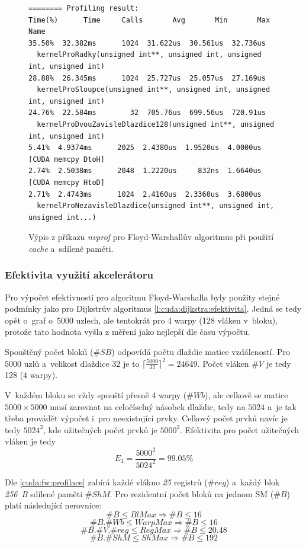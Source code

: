 \begin{figure}
	\centering
	\begin{verbatim}
======== Profiling result:
Time(%)      Time     Calls       Avg       Min       Max  Name
35.50%  32.382ms      1024  31.622us  30.561us  32.736us
  kernelProRadky(unsigned int**, unsigned int, unsigned int, unsigned int)
28.88%  26.345ms      1024  25.727us  25.057us  27.169us
  kernelProSloupce(unsigned int**, unsigned int, unsigned int, unsigned int)
24.76%  22.584ms        32  705.76us  699.56us  720.91us
  kernelProDvouZavisleDlazdice128(unsigned int**, unsigned int, unsigned int)
5.41%  4.9374ms      2025  2.4380us  1.9520us  4.0000us  [CUDA memcpy DtoH]
2.74%  2.5038ms      2048  1.2220us     832ns  1.6640us  [CUDA memcpy HtoD]
2.71%  2.4743ms      1024  2.4160us  2.3360us  3.6800us
  kernelProNezavisleDlazdice(unsigned int**, unsigned int, unsigned int...)
	\end{verbatim}
	\caption{Výpis z příkazu \emph{nvprof} pro Floyd-Warshallův algoritmus při použití \emph{cache} a~sdílené paměti.}
    \label{f:cuda:floyd:profilace2}
\end{figure}

\subsubsection{Efektivita využití akcelerátoru} \label{l:cuda:floyd:efektivita}
Pro výpočet efektivnosti pro algoritmu Floyd-Warshalla byly použity stejné podmínky jako pro Dijkstrův algoritmus \ref{l:cuda:dijkstra:efektivita}. Jedná se tedy opět o~graf o~5000 uzlech, ale tentokrát pro 4 warpy (128 vláken v~bloku), protože tato hodnota vyšla z měření jako nejlepší dle času výpočtu.

Spouštěný počet bloků ($\#SB$) odpovídá počtu dlaždic matice vzdáleností. Pro $5000$ uzlů a~velikost dlaždice $32$ je to 
$\lceil \frac{5000}{32} \rceil ^ 2 = 24649$. Počet vláken $\#V$ je tedy 128 (4 warpy).

V~každém bloku se vždy spouští přesně 4 warpy ($ \#Wb $), ale celkově se matice $5000 \times 5000$ musí zarovnat na celočíselný násobek
dlaždic, tedy na $5024$ a~je tak třeba provádět výpočet i~pro neexistující prvky. Celkový počet prvků navíc je tedy $ 5024^2 $, kde 
užitečných počet prvků je $ 5000^2 $. Efektivita pro počet užitečných vláken je tedy
$$ E_1 = \frac{5000^2}{5024^2} = 99.05 \% $$


Dle \ref{cuda:fw:profilace} zabírá každé vlákno \emph{25} registrů ($\#reg$) a~každý blok \emph{256~B} sdílené paměti $\#ShM$. Pro rezidentní počet 
bloků na jednom SM ($\#B$)  platí následující nerovnice:
$$               \#B \leq BlMax   \Rightarrow  \#B \leq 16    $$
$$        \#B . \#Wb \leq WarpMax \Rightarrow  \#B \leq 16    $$
$$ \#B . \#V . \#reg \leq RegMax  \Rightarrow  \#B \leq 20.48 $$
$$       \#B . \#ShM \leq ShMax   \Rightarrow  \#B \leq 192   $$

